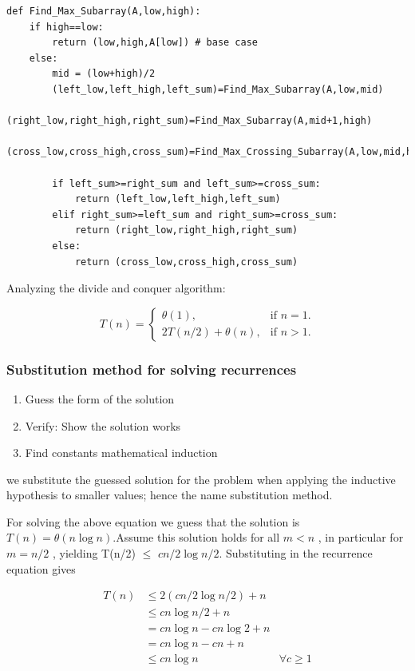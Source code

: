 \documentclass[11pt]{article}
\begin{document}
\begin{verbatim}
def Find_Max_Subarray(A,low,high):
    if high==low:
        return (low,high,A[low]) # base case
    else:
        mid = (low+high)/2
        (left_low,left_high,left_sum)=Find_Max_Subarray(A,low,mid)
        (right_low,right_high,right_sum)=Find_Max_Subarray(A,mid+1,high)
        (cross_low,cross_high,cross_sum)=Find_Max_Crossing_Subarray(A,low,mid,high)

        if left_sum>=right_sum and left_sum>=cross_sum:
            return (left_low,left_high,left_sum)
        elif right_sum>=left_sum and right_sum>=cross_sum:
            return (right_low,right_high,right_sum)
        else:
            return (cross_low,cross_high,cross_sum)
\end{verbatim}

Analyzing the divide and conquer algorithm:

\begin{equation}
T(n) = \begin{cases}
\theta(1), & \text{if $n=1$}.\\
2T(n/2) + \theta(n), & \text{if $n>1$}.
\end{cases}
\end{equation}

\subsubsection{Substitution method for solving recurrences}
\label{sec:org6984e1c}
\begin{enumerate}
\item Guess the form of the solution
\item Verify: Show the solution works
\item Find constants mathematical induction
\end{enumerate}
we substitute the guessed solution for the problem when applying the inductive hypothesis to smaller values; hence the name substitution method.

For solving the above equation we guess that the solution is \(T(n)=\theta(n \log n)\).Assume this solution holds for all \(m < n\) , in particular for \(m = n/2\) , yielding
T(n/2) \(\le\) \(c n/2 \log n/2\). Substituting in the recurrence equation gives

\begin{align*}
T(n) &\leq 2(c n/2 \log n/2) + n \\
&\leq c n \log n/2 + n \\
&= cn \log n - cn \log2 + n \\
&= cn \log n - cn + n \\
&\leq cn \log n & \forall c \geq 1
\end{align*}
\end{document}
